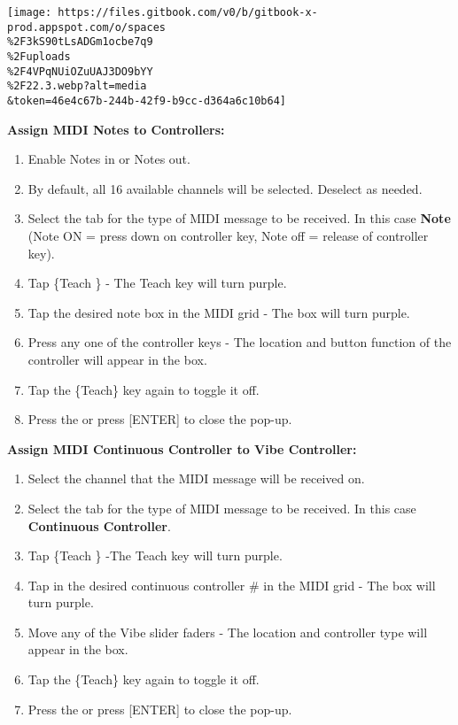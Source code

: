 \documentclass[
]{article}
\begin{document}
\texttt{[image: https://files.gitbook.com/v0/b/gitbook-x-prod.appspot.com/o/spaces\\\%2F3kS90tLsADGm1ocbe7q9\\\%2Fuploads\\\%2F4VPqNUiOZuUAJ3DO9bYY\\\%2F22.3.webp?alt=media\\\&token=46e4c67b-244b-42f9-b9cc-d364a6c10b64]}

\textbf{Assign MIDI Notes to Controllers:}

\begin{enumerate}
\def\labelenumi{\arabic{enumi}.}
\item
  Enable Notes in or Notes out.
\item
  By default, all 16 available channels will be selected. Deselect as needed.
\item
  Select the tab for the type of MIDI message to be received. In this case \textbf{Note} (Note ON = press down on controller key, Note off = release of controller key).
\item
  Tap \{Teach \} - The Teach key will turn purple.
\item
  Tap the desired note box in the MIDI grid - The box will turn purple.
\item
  Press any one of the controller keys - The location and button function of the controller will appear in the box.
\item
  Tap the \{Teach\} key again to toggle it off.
\item
  Press the \href{image.png}{} or press {[}ENTER{]} to close the pop-up.
\end{enumerate}

\textbf{Assign MIDI Continuous Controller to Vibe Controller:}

\begin{enumerate}
\def\labelenumi{\arabic{enumi}.}
\item
  Select the channel that the MIDI message will be received on.
\item
  Select the tab for the type of MIDI message to be received. In this case \textbf{Continuous Controller}.
\item
  Tap \{Teach \} -The Teach key will turn purple.
\item
  Tap in the desired continuous controller \# in the MIDI grid - The box will turn purple.
\item
  Move any of the Vibe slider faders - The location and controller type will appear in the box.
\item
  Tap the \{Teach\} key again to toggle it off.
\item
  Press the or press {[}ENTER{]} to close the pop-up.
\end{enumerate}
\end{document}
